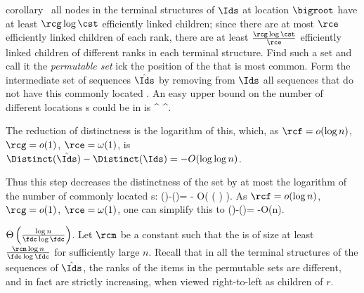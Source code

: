  corollary~ all nodes in the terminal structures of $\Ids$ at location $\bigroot$ have at least ${\rcg \log \cst}$ efficiently linked children; since there are at most $\rce $ efficiently linked children of each rank,  there are at least  $\frac{\rcg \log \cst}{\rce   }$ efficiently linked children of different ranks in each terminal structure. Find such a set and call it the \emph{permutable set} ick the position of the  that is most common. Form the intermediate set of sequences $\hat{\Ids}$ by removing from $\Ids$ all sequences that do not have this commonly located .
An easy upper bound on the number of different locations s could be in is
\shortfull{$}{$$} \overbrace{\frac{\rcg \log \cst}{\rce   }}^{} \cdot  \overbrace{{\rcf  \log \cst}}^{}. \shortfull{$}{$$}
\begin{shortonly}
The reduction of distinctness is the logarithm of this, which, as $\rcf=o(\log n)$, $\rcg=o(1)$, $\rce=\omega(1)$, is
$\Distinct(\hat{\Ids})-\Distinct(\Ids)= -O(\log \log n)$.
\end{shortonly}
\begin{fullonly}
Thus this step decreases the distinctness of the set by at most the logarithm of the number of commonly located s:  
\shortfull{$}{$$}\Distinct(\hat{\Ids})-\Distinct(\Ids)=   - 
O\left( \log \left( \frac{\rcg \log \cst}{\rce   } \cdot  {\rcf  \log \cst} \right) \right).\shortfull{$}{$$}
As $\rcf=o(\log n)$, $\rcg=o(1)$, $\rce=\omega(1)$, one can simplify this to
\shortfull{$}{$$}\Distinct(\hat{\Ids})-\Distinct(\Ids)=   -O(\log \log n).\shortfull{$}{$$}
\end{fullonly}

 $\Theta\left(\frac{\log n}{\fdc \log \fdc}\right)$. Let $\rcm$ be a constant such that the  is of size at least $\frac{\rcm \log n}{\fdc \log \fdc}$ for sufficiently large $n$. Recall that in all the terminal structures
of the sequences of $\hat{\Ids}$, the ranks of the items in the permutable sets are different, and in fact are strictly increasing, when viewed right-to-left as children of $r$.


